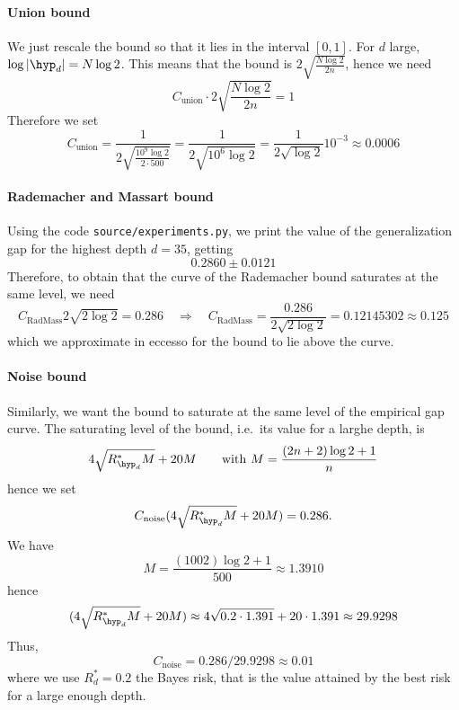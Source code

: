 \documentclass[reqno]{amsart}
\begin{document}
\paragraph{Union bound} We just rescale the bound so that it lies in the interval $[0,1]$. For $d$ large, $\log\vert\hyp_d\vert = N\log 2$. This means that the bound is $2 \sqrt{\frac{N\log 2}{2n}}$, hence we need
\[
C_\text{union}\cdot 2 \sqrt{\frac{N\log 2}{2n}} = 1
\]
Therefore we set
\[ C_\text{union} = \frac{1}{2 \sqrt{\frac{10^9\log 2}{2\cdot 500}}} = \frac{1}{2 \sqrt{ 10^6\log 2 }} = \frac{1}{2\sqrt{\log 2}}10^{-3} \approx 0.0006
\]


\paragraph{Rademacher and Massart bound} Using the code \texttt{source/experiments.py}, we print the value of the generalization gap for the highest depth $d=35$, getting 
\[
0.2860 \pm 0.0121
\]
Therefore, to obtain that the curve of the Rademacher bound saturates at the same level, we need
\[
C_{\text{RadMass}}2\sqrt{2\log 2} = 0.286 \quad \Rightarrow \quad C_{\text{RadMass}} = \frac{0.286}{2\sqrt{2\log 2}} = 0.12145302 \approx 0.125
\]
which we approximate in eccesso for the bound to lie above the curve. 


\paragraph{Noise bound} Similarly, we want the bound to saturate at the same level of the empirical gap curve. The saturating level of the bound, i.e.\ its value for a larghe depth, is 
\[
4\sqrt{R^*_{\hyp_d}M} + 20M \qquad \text{with }M = \frac{(2n+2)\log 2+1}{n}
\]
hence we set
\[
C_{\text{noise}} (4\sqrt{R^*_{\hyp_d}M} + 20M) = 0.286.
\]
We have 
\[
M = \frac{(1002)\log 2+1}{500} \approx 1.3910
\]
hence 
\[
(4\sqrt{R^*_{\hyp_d}M} + 20M) \approx 4 \sqrt{0.2\cdot 1.391} + 20\cdot 1.391 \approx 29.9298
\]
Thus,
\[
C_{\text{noise}} = 0.286 / 29.9298 \approx 0.01
\]
where we use $R^*_d = 0.2$ the Bayes risk, that is the value attained by the best risk for a large enough depth. 
\end{document}
